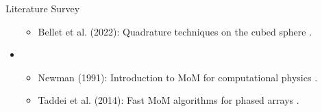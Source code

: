 \begin{frame}[ allowframebreaks ]{Literature Survey}
\begin{itemize}
\begin{itemize}
                \item Bellet et al. (2022): Quadrature techniques on the cubed sphere \cite{bellet2022quadrature}.
            \end{itemize}
        \item {}
            \begin{itemize}
                \item Newman (1991): Introduction to MoM for computational physics \cite{newman1991introduction}.
                \item Taddei et al. (2014): Fast MoM algorithms for phased arrays \cite{6986493}.
            \end{itemize}
    \end{itemize}
\end{frame}

\endinput  %
